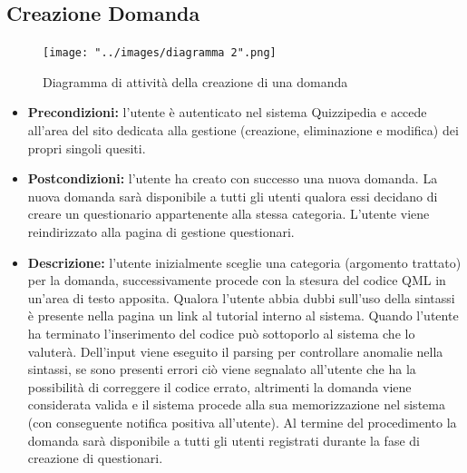 \documentclass[a4paper,11pt]{article}
\begin{document}
\subsection{Creazione Domanda}
\begin{figure}[h!]
\begin{center}
	\centerline{\texttt{[image: "../images/diagramma 2".png]}}
	\caption{Diagramma di attività della creazione di una domanda}
\end{center}
\end{figure}
\begin{itemize}
\item\textbf{Precondizioni:} l'utente è autenticato nel sistema Quizzipedia e accede all'area del sito dedicata alla gestione (creazione, eliminazione e modifica) dei propri singoli quesiti.
\item\textbf{Postcondizioni:} l'utente ha creato con successo una nuova domanda. La nuova domanda sarà disponibile a tutti gli utenti qualora essi decidano di creare un questionario appartenente alla stessa categoria. L'utente viene reindirizzato alla pagina di gestione questionari. %
\item\textbf{Descrizione:} l'utente inizialmente sceglie una categoria (argomento trattato) per la domanda, successivamente procede con la stesura del codice QML in un'area di testo apposita. Qualora l'utente abbia dubbi sull'uso della sintassi è presente nella pagina un link al tutorial interno al sistema. Quando l'utente ha terminato l'inserimento del codice può sottoporlo al sistema che lo valuterà. Dell'input viene eseguito il parsing per controllare anomalie nella sintassi, se sono presenti errori ciò viene segnalato all'utente che ha la possibilità di correggere il codice errato, altrimenti la domanda viene considerata valida e il sistema procede alla sua memorizzazione nel sistema (con conseguente notifica positiva all'utente). Al termine del procedimento la domanda sarà disponibile a tutti gli utenti registrati durante la fase di creazione di questionari.
\end{itemize}
\newpage
\end{document}
